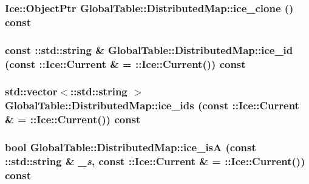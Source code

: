 \label{class_global_table_1_1_distributed_map_a5a434538e73a409df08c2c37829b77ef}
\hypertarget{class_global_table_1_1_distributed_map_a4a8b48c7d1b425910616cc6dc3aff56d}{
\subsubsection[{ice\_\-clone}]{\setlength{\rightskip}{0pt plus 5cm}Ice::ObjectPtr GlobalTable::DistributedMap::ice\_\-clone () const}}
\label{class_global_table_1_1_distributed_map_a4a8b48c7d1b425910616cc6dc3aff56d}
\hypertarget{class_global_table_1_1_distributed_map_ac76200d6aeeac0d53b68e04312dbd9c9}{
\subsubsection[{ice\_\-id}]{\setlength{\rightskip}{0pt plus 5cm}const ::std::string \& GlobalTable::DistributedMap::ice\_\-id (const ::Ice::Current \& = {\ttfamily ::Ice::Current()}) const}}
\label{class_global_table_1_1_distributed_map_ac76200d6aeeac0d53b68e04312dbd9c9}
\hypertarget{class_global_table_1_1_distributed_map_a3160cec3051d85a8fbaf4e97ba47f342}{
\subsubsection[{ice\_\-ids}]{\setlength{\rightskip}{0pt plus 5cm}std::vector$<$::std::string $>$ GlobalTable::DistributedMap::ice\_\-ids (const ::Ice::Current \& = {\ttfamily ::Ice::Current()}) const}}
\label{class_global_table_1_1_distributed_map_a3160cec3051d85a8fbaf4e97ba47f342}
\hypertarget{class_global_table_1_1_distributed_map_a1647e32806d42ace0aecb773bd96959f}{
\subsubsection[{ice\_\-isA}]{\setlength{\rightskip}{0pt plus 5cm}bool GlobalTable::DistributedMap::ice\_\-isA (const ::std::string \& {\em \_\-s}, \/  const ::Ice::Current \& = {\ttfamily ::Ice::Current()}) const}}
